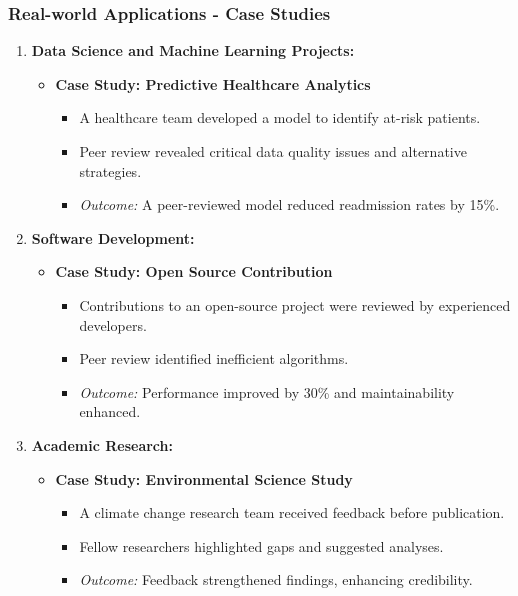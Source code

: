 \documentclass{beamer}
\begin{document}
\begin{frame}[fragile]
    \frametitle{Real-world Applications - Case Studies}
    \begin{enumerate}
        \item \textbf{Data Science and Machine Learning Projects:}
            \begin{itemize}
                \item \textbf{Case Study: Predictive Healthcare Analytics}
                \begin{itemize}
                    \item A healthcare team developed a model to identify at-risk patients.
                    \item Peer review revealed critical data quality issues and alternative strategies.
                    \item \textit{Outcome:} A peer-reviewed model reduced readmission rates by 15\%.
                \end{itemize}
            \end{itemize}
        
        \item \textbf{Software Development:}
            \begin{itemize}
                \item \textbf{Case Study: Open Source Contribution}
                \begin{itemize}
                    \item Contributions to an open-source project were reviewed by experienced developers.
                    \item Peer review identified inefficient algorithms.
                    \item \textit{Outcome:} Performance improved by 30\% and maintainability enhanced.
                \end{itemize}
            \end{itemize}
        
        \item \textbf{Academic Research:}
            \begin{itemize}
                \item \textbf{Case Study: Environmental Science Study}
                \begin{itemize}
                    \item A climate change research team received feedback before publication.
                    \item Fellow researchers highlighted gaps and suggested analyses.
                    \item \textit{Outcome:} Feedback strengthened findings, enhancing credibility.
                \end{itemize}
            \end{itemize}
    \end{enumerate}
\end{frame}
\end{document}
